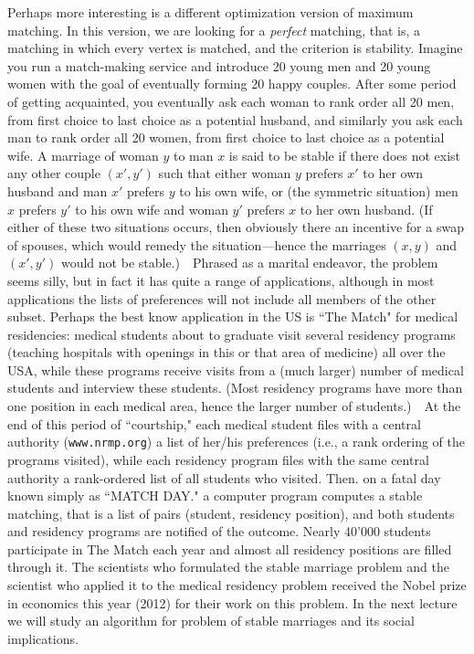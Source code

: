 \documentclass[11pt]{article}
\begin{document}
Perhaps more interesting is a different optimization version of maximum matching.
In this version, we are looking for a \emph{perfect} matching, that is,
a matching in which every vertex is matched, and the criterion is stability.
Imagine you run a match-making service and introduce 20 young men and 20 young women with the goal of eventually forming 20 happy couples.  After some period
of getting acquainted, you eventually ask each woman to rank order all 20 men,
from first choice to last choice as a potential husband, and similarly you ask
each man to rank order all 20 women, from first choice to last choice as a
potential wife.  A marriage of woman $y$ to man $x$ is said to be stable
if there does not exist any other couple $(x',y')$ such that either woman $y$
prefers $x'$ to her own husband and man $x'$ prefers $y$ to his own wife,
or (the symmetric situation) men $x$ prefers $y'$ to his own wife and woman
$y'$ prefers $x$ to her own husband.  (If either of these two situations
occurs, then obviously there an incentive for a swap of spouses, which would
remedy the situation---hence the marriages $(x,y)$ and $(x',y')$ would not
be stable.)\ \ Phrased as a marital endeavor, the problem seems silly, but in
fact it has quite a range of applications, although in most applications the
lists of preferences will not include all members of the other subset.
Perhaps the best know application in the US is ``The Match" for
medical residencies: medical students about to graduate visit several
residency programs (teaching hospitals with openings in this or that area of
medicine) all over the USA, while these programs receive visits from a
(much larger) number of medical students and interview these students.
(Most residency programs have more than one position in each medical area,
hence the larger number of students.)\ \ 
At the end of this period of ``courtship," each medical student files with
a central authority (\texttt{www.nrmp.org}) a list of her/his preferences
(i.e., a rank ordering
of the programs visited), while each residency program files with the same
central authority a rank-ordered list of all students who visited.
Then. on a fatal day known simply as ``MATCH DAY." a computer program
computes a stable matching, that is a list of pairs
(student, residency position), and both students and residency programs
are notified of the outcome.  Nearly 40'000 students participate in The
Match each year and almost all residency positions are filled through it.
The scientists who formulated the stable marriage problem and the scientist
who applied it to the medical residency problem received the Nobel prize in
economics this year (2012) for their work on this problem.
In the next lecture we will study an algorithm for problem of stable marriages
and its social implications.
\end{document}
